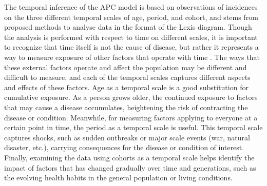 The temporal inference of the APC model is based on observations of incidences on the three different temporal scales of age, period, and cohort, and stems from proposed methods to analyse data in the format of the Lexis diagram. Though the analysis is performed with respect to time on different scales, it is important to recognize that time itself is not the cause of disease, but rather it represents a way to measure exposure of other factors that operate with time \citep{berzuini1994bayesian}. The ways that these external factors operate and affect the population may be different and difficult to measure, and each of the temporal scales captures different aspects and effects of these factors. Age as a temporal scale is a good substitution for cumulative exposure. As a person grows older, the continued exposure to factors that may cause a disease accumulates, heightening the risk of contracting the disease or condition. Meanwhile, for measuring factors applying to everyone at a certain point in time, the period as a temporal scale is useful. This temporal scale captures shocks, such as sudden outbreaks or major scale events (war, natural disaster, etc.), carrying consequences for the disease or condition of interest. Finally, examining the data using cohorts as a temporal scale helps identify the impact of factors that has changed gradually over time and generations, such as the evolving health habits in the general population or living conditions.

